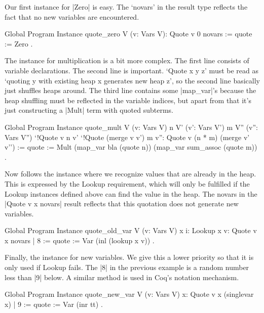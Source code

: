 \documentclass[a4paper,10pt, runningheads]{llncs}
\begin{document}
Our first instance for |Zero| is easy. The `novars' in the result type reflects the fact that no
new variables are encountered.
\begin{code}
  Global Program Instance quote_zero V (v: Vars V):
    Quote v 0 novars :=
  { quote := Zero }.
\end{code}

The instance for multiplication is a bit more complex. The first line consists of
 variable declarations. The second line is important. `Quote x y z' must be read as
 `quoting y with existing heap x generates new heap z', so the second line basically just
shuffles heaps around.
 The third line contains some |map_var|'s because the heap shuffling must be
reflected in the variable indices, but apart from that it's just constructing a |Mult| term with
quoted subterms.

\begin{code}
Global Program Instance quote_mult V (v: Vars V)
  n V' (v': Vars V') m V'' (v'': Vars V'')
  `{!Quote v n v'} `{!Quote (merge v v') m v''}:
  Quote v (n * m) (merge v' v'') :=
  { quote := Mult (map_var bla (quote n)) (map_var sum_assoc (quote m)) }.
\end{code}
  Now follows the instance where we recognize values that are already in the heap. This
   is expressed by the Lookup requirement, which will only be fulfilled if the Lookup instances
   defined above can find the value in the heap. The novars in the |Quote v x novars| result
   reflects that this quotation does not generate new variables.

\begin{code}
Global Program Instance quote_old_var
  V (v: Vars V) x {i: Lookup x v}:
  Quote v x novars | 8 := { quote := Var (inl (lookup x v)) }.
\end{code}

\noindent Finally, the instance for new variables. We give this a lower priority so that it is only
used if Lookup fails. The |8| in the previous example is a random number less than |9| below. A
similar method is used in Coq's notation mechanism.

\begin{code}
Global Program Instance quote_new_var V (v: Vars V) x:
  Quote v x (singlevar x) | 9 := { quote := Var (inr tt) }.
\end{code}
\end{document}

